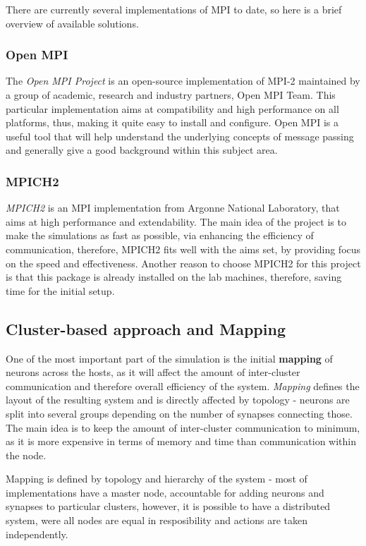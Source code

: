 There are currently several implementations of MPI to date, so here is a brief overview of available solutions.

\subsubsection{Open MPI}

The \emph{Open MPI Project} is an open-source implementation of MPI-2 maintained by a group of academic, research and industry partners, Open MPI Team.\cite{RichardL.Graham2005} This particular 
implementation aims at compatibility and high performance on all platforms, thus, making it quite easy to install and configure. Open MPI is a useful tool that will help understand 
the underlying concepts of message passing and generally give a good background within this subject area.

\subsubsection{MPICH2}

\emph{MPICH2} is an MPI implementation from Argonne National Laboratory, that aims at high performance and extendability.\cite{W.Gropp1999} The main idea of the project is to make the simulations as
fast as possible, via enhancing the efficiency of communication, therefore, MPICH2 fits well with the aims set, by providing focus on the speed and effectiveness. Another reason to choose 
MPICH2 for this project is that this package is already installed on the lab machines, therefore, saving time for the initial setup.\cite{W.Gropp1999a}

\subsection{Cluster-based approach and Mapping}

One of the most important part of the simulation is the initial \textbf{mapping} of neurons across the hosts, as it will affect the amount of inter-cluster communication and therefore overall efficiency
of the system. \emph{Mapping} defines the layout of the resulting system and is directly affected by topology - neurons are split into several groups depending on the number of synapses connecting those.
The main idea is to keep the amount of inter-cluster communication to minimum, as it is more expensive in terms of memory and time than communication within the node.

Mapping is defined by topology and hierarchy of the system - most of implementations have a master node, accountable for adding neurons and synapses to particular clusters, however, it is
possible to have a distributed system, were all nodes are equal in resposibility and actions are taken independently.

